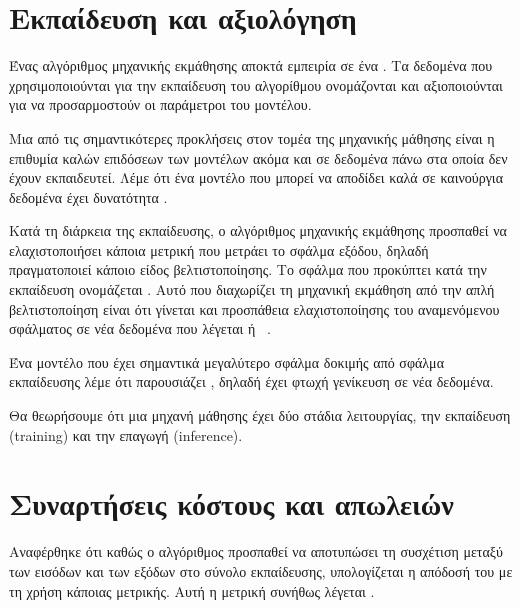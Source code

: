 \section{Εκπαίδευση και αξιολόγηση}
Ένας αλγόριθμος μηχανικής εκμάθησης αποκτά εμπειρία σε ένα .
Τα δεδομένα που χρησιμοποιούνται για την εκπαίδευση του αλγορίθμου ονομάζονται  και αξιοποιούνται για να προσαρμοστούν οι παράμετροι του μοντέλου.

Μια από τις σημαντικότερες προκλήσεις στον τομέα της μηχανικής μάθησης είναι η επιθυμία καλών επιδόσεων των μοντέλων ακόμα και σε δεδομένα πάνω στα οποία δεν έχουν εκπαιδευτεί.
Λέμε ότι ένα μοντέλο που μπορεί να αποδίδει καλά σε καινούργια δεδομένα έχει δυνατότητα .

Κατά τη διάρκεια της εκπαίδευσης, ο αλγόριθμος μηχανικής εκμάθησης προσπαθεί να ελαχιστοποιήσει κάποια μετρική που μετράει το σφάλμα εξόδου, δηλαδή πραγματοποιεί κάποιο είδος βελτιστοποίησης.
Το σφάλμα που προκύπτει κατά την εκπαίδευση ονομάζεται .
Αυτό που διαχωρίζει τη μηχανική εκμάθηση από την απλή βελτιστοποίηση είναι ότι γίνεται και προσπάθεια ελαχιστοποίησης του αναμενόμενου σφάλματος σε νέα δεδομένα που
λέγεται  ή ~\cite{goodfellow}.

Ένα μοντέλο που έχει σημαντικά μεγαλύτερο σφάλμα δοκιμής από σφάλμα εκπαίδευσης λέμε ότι παρουσιάζει ,
δηλαδή έχει φτωχή γενίκευση σε νέα δεδομένα.

Θα θεωρήσουμε ότι μια μηχανή μάθησης έχει δύο στάδια λειτουργίας, την εκπαίδευση (training) και την επαγωγή (inference).

\section{Συναρτήσεις κόστους και απωλειών}
Αναφέρθηκε ότι καθώς ο αλγόριθμος προσπαθεί να αποτυπώσει τη συσχέτιση μεταξύ των εισόδων και των εξόδων στο σύνολο εκπαίδευσης, υπολογίζεται η απόδοσή του με τη χρήση κάποιας μετρικής.
Αυτή η μετρική συνήθως λέγεται .


